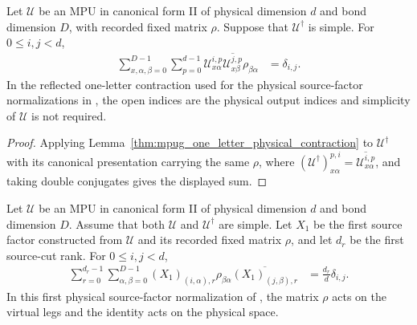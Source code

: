 \begin{lemma}
    \label{thm:mpug_one_letter_output_contraction}
    \leanok
    Let $\mathcal U$ be an MPU in canonical form II of physical dimension
    $d$ and bond dimension $D$, with recorded fixed matrix $\rho$.
    Suppose that $\mathcal U^\dagger$ is simple. For $0\leq i,j<d$,
    \begin{align}
        \sum_{x,\alpha,\beta=0}^{D-1}\sum_{p=0}^{d-1}
        \mathcal U^{i,p}_{x\alpha}
        \overline{\mathcal U^{j,p}_{x\beta}}\rho_{\beta\alpha}
         & =\delta_{i,j}.
    \end{align}
    In the reflected one-letter contraction used for the physical
    source-factor normalizations in
    \cite[lines~1120--1162 and 1398]{FrancoRubio2025MPUGauging}, the open
    indices are the physical output indices and simplicity of $\mathcal U$
    is not required.
\end{lemma}

\begin{proof}\leanok
    Applying Lemma~\ref{thm:mpug_one_letter_physical_contraction} to
    $\mathcal U^\dagger$ with its canonical presentation carrying the
    same $\rho$, where
    $(\mathcal U^\dagger)^{p,i}_{x\alpha}=\overline{\mathcal U^{i,p}_{x\alpha}}$,
    and taking double conjugates gives the displayed sum.
\end{proof}

\begin{lemma}
    \label{thm:mpug_source_x_one_physical_normalization}
    \leanok
    Let $\mathcal U$ be an MPU in canonical form II of physical dimension
    $d$ and bond dimension $D$. Assume that both $\mathcal U$ and
    $\mathcal U^\dagger$ are simple. Let $X_1$ be the first source factor
    constructed from $\mathcal U$ and its recorded fixed matrix $\rho$,
    and let $d_r$ be the first source-cut rank. For $0\leq i,j<d$,
    \begin{align}
        \sum_{r=0}^{d_r-1}\sum_{\alpha,\beta=0}^{D-1}
        (X_1)_{(i,\alpha),r}\rho_{\beta\alpha}
        \overline{(X_1)_{(j,\beta),r}}
         & =\frac{d_r}{d}\delta_{i,j}.
    \end{align}
    In this first physical source-factor normalization of
    \cite[lines~1120--1162]{FrancoRubio2025MPUGauging}, the matrix $\rho$
    acts on the virtual legs and the identity acts on the physical space.
\end{lemma}

